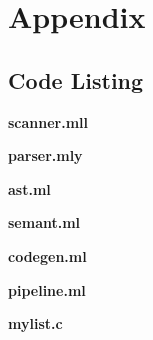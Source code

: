 \documentclass[./Report_main.tex]{subfiles}
\begin{document}


\chapter{Appendix}
\section*{Code Listing}
\textbf{scanner.mll}

\textbf{parser.mly}

\textbf{ast.ml}

\textbf{semant.ml}

\textbf{codegen.ml}

\textbf{pipeline.ml}

\textbf{mylist.c}
%
\end{document}
